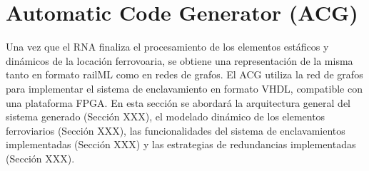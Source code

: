 \chapter{Automatic Code Generator (ACG)}
\label{sec:ACG}
    
    Una vez que el RNA finaliza el procesamiento de los elementos estáficos y dinámicos de la locación ferrovoaria, se obtiene una representación de la misma tanto en formato railML como en redes de grafos. El ACG utiliza la red de grafos para implementar el sistema de enclavamiento en formato VHDL, compatible con una plataforma FPGA. En esta sección se abordará la arquitectura general del sistema generado (Sección XXX), el modelado dinámico de los elementos ferroviarios (Sección XXX), las funcionalidades del sistema de enclavamientos implementadas (Sección XXX) y las estrategias de redundancias implementadas (Sección XXX).
    
    
    
     
    
    
